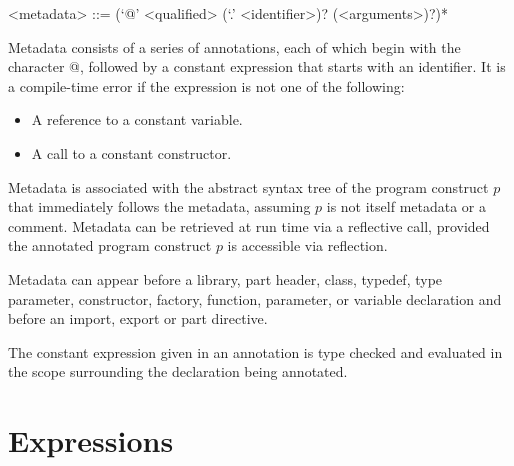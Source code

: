 \documentclass[makeidx]{article}
\begin{document}
\begin{grammar}
<metadata> ::= (`@' <qualified> (`.' <identifier>)? (<arguments>)?)*
\end{grammar}

\LMHash{}%
Metadata consists of a series of annotations, each of which begin with the character @, followed by a constant expression that starts with an identifier.
It is a compile-time error if the expression is not one of the following:
\begin{itemize}
\item A reference to a constant variable.
\item A call to a constant constructor.
\end{itemize}

\LMHash{}%
Metadata is associated with the abstract syntax tree of the program construct $p$ that immediately follows the metadata, assuming $p$ is not itself metadata or a comment.
Metadata can be retrieved at run time via a reflective call, provided the annotated program construct $p$ is accessible via reflection.




\LMHash{}%
Metadata can appear before a library, part header, class, typedef, type parameter, constructor, factory, function, parameter, or variable declaration and before an import, export or part directive.

\LMHash{}%
The constant expression given in an annotation is type checked and evaluated in the scope surrounding the declaration being annotated.


\section{Expressions}
\end{document}
